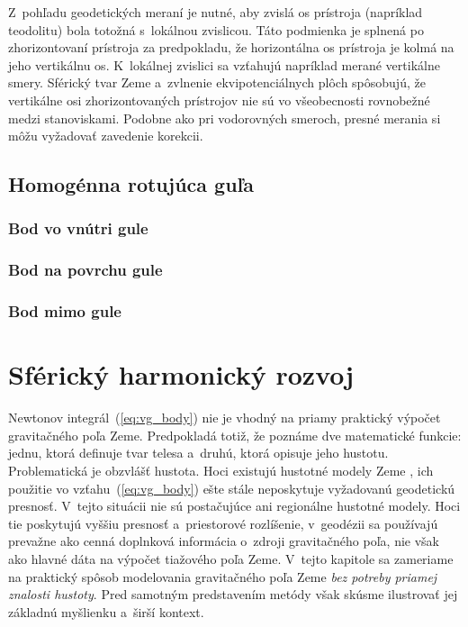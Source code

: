 \documentclass[a4paper, 12pt]{book}
\begin{document}
Z~pohľadu geodetických meraní je nutné, aby zvislá os prístroja (napríklad
teodolitu) bola totožná s~lokálnou zvislicou.  Táto podmienka je splnená po
zhorizontovaní prístroja za predpokladu, že horizontálna os prístroja je kolmá
na jeho vertikálnu os.  K~lokálnej zvislici sa vzťahujú napríklad merané
vertikálne smery.  Sférický tvar Zeme a~zvlnenie ekvipotenciálnych plôch
spôsobujú, že vertikálne osi zhorizontovaných prístrojov nie sú vo všeobecnosti
rovnobežné medzi stanoviskami.  Podobne ako pri vodorovných smeroch, presné
merania si môžu vyžadovať zavedenie korekcii.



\section{Homogénna rotujúca guľa}
\label{sec:homogeneous_ball}

\subsection{Bod vo vnútri gule}
\label{sec:homogeneous_ball_int}

\subsection{Bod na povrchu gule}
\label{sec:homogeneous_ball_sur}

\subsection{Bod mimo gule}
\label{sec:homogeneous_ball_ext}







\chapter{Sférický harmonický rozvoj}
\label{sec:spherical_harmonic_expansion}

Newtonov integrál~(\ref{eq:vg_body}) nie je vhodný na priamy praktický výpočet
gravitačného poľa Zeme.  Predpokladá totiž, že poznáme dve matematické funkcie:
jednu, ktorá definuje tvar telesa a~druhú, ktorá opisuje jeho hustotu.
Problematická je obzvlášť hustota.  Hoci existujú hustotné modely Zeme
\citep[napríklad][]{Dziewonski1981}, ich použitie vo vzťahu~(\ref{eq:vg_body})
ešte stále neposkytuje vyžadovanú geodetickú presnosť.  V~tejto situácii nie sú
postačujúce ani regionálne hustotné modely.  Hoci tie poskytujú vyššiu presnosť
a~priestorové rozlíšenie, v~geodézii sa používajú prevažne ako cenná doplnková
informácia o~zdroji gravitačného poľa, nie však ako hlavné dáta na výpočet
tiažového poľa Zeme.  V~tejto kapitole sa zameriame na praktický spôsob
modelovania gravitačného poľa Zeme \emph{bez potreby priamej znalosti hustoty}.
Pred samotným predstavením metódy však skúsme ilustrovať jej základnú myšlienku
a~širší kontext.
\end{document}
